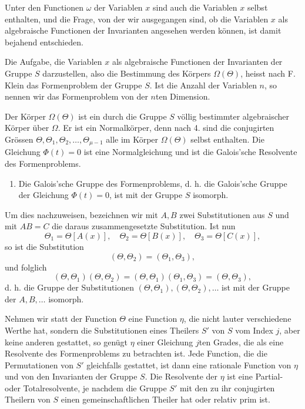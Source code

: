 \documentclass[11pt]{article}
\begin{document}
Unter den Functionen $\omega$ der Variablen $x$ sind auch die Variablen $x$ selbst enthalten, und die Frage, von der wir ausgegangen sind, ob die Variablen $x$ als algebraische Functionen der Invarianten angesehen werden können, ist damit bejahend entschieden.

Die Aufgabe, die Variablen $x$ als algebraische Functionen der Invarianten der Gruppe $S$ darzustellen, also die Bestimmung des Körpers $\Omega(\Theta)$, heisst nach F. Klein das Formenproblem der Gruppe $S$. Ist die Anzahl der Variablen $n$, so nennen wir das Formenproblem von der $n$ten Dimension.

Der Körper $\Omega(\Theta)$ ist ein durch die Gruppe $S$ völlig bestimmter algebraischer Körper über $\Omega$. Er ist ein Normalkörper, denn nach 4. sind die conjugirten Grössen $\Theta,\Theta_1,\Theta_2,\ldots,\Theta_{\mu-1}$ alle im Körper $\Omega(\Theta)$ selbst enthalten. Die Gleichung $\Phi(t)=0$ ist eine Normalgleichung und ist die Galois'sche Resolvente des Formenproblems.

\begin{enumerate}[label=\arabic*.,leftmargin=2.2em,start=5]
\item Die Galois'sche Gruppe des Formenproblems, d. h. die Galois'sche Gruppe der Gleichung $\Phi(t)=0$, ist mit der Gruppe $S$ isomorph.
\end{enumerate}
Um dies nachzuweisen, bezeichnen wir mit $A,B$ zwei Substitutionen aus $S$ und mit $AB=C$ die daraus zusammengesetzte Substitution. Ist nun
\[
\Theta_1=\Theta[A(x)],\quad \Theta_2=\Theta[B(x)],\quad \Theta_3=\Theta[C(x)],
\]
so ist die Substitution
\[
(\Theta,\Theta_2)=(\Theta_1,\Theta_3),
\]
und folglich
\[
(\Theta,\Theta_1)(\Theta,\Theta_2)=(\Theta,\Theta_1)(\Theta_1,\Theta_3)=(\Theta,\Theta_3),
\]
d. h. die Gruppe der Substitutionen $(\Theta,\Theta_1),(\Theta,\Theta_2),\ldots$ ist mit der Gruppe der $A,B,\ldots$ isomorph.

Nehmen wir statt der Function $\Theta$ eine Function $\eta$, die nicht lauter verschiedene Werthe hat, sondern die Substitutionen eines Theilers $S'$ von $S$ vom Index $j$, aber keine anderen gestattet, so genügt $\eta$ einer Gleichung $j$ten Grades, die als eine Resolvente des Formenproblems zu betrachten ist. Jede Function, die die Permutationen von $S'$ gleichfalls gestattet, ist dann eine rationale Function von $\eta$ und von den Invarianten der Gruppe $S$. Die Resolvente der $\eta$ ist eine Partial- oder Totalresolvente, je nachdem die Gruppe $S'$ mit den zu ihr conjugirten Theilern von $S$ einen gemeinschaftlichen Theiler hat oder relativ prim ist.
\end{document}
